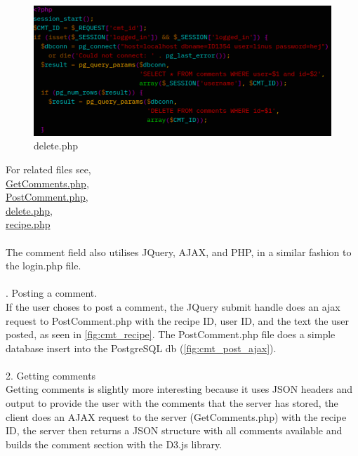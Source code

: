 \documentclass[a4paper]{scrartcl}
\begin{document}
\begin{figure}[H]
  \begin{center}
    \includegraphics[scale=0.9]{images/cmt_delete.png}
    \caption{delete.php}
    \label{fig:cmt_delete}
  \end{center}
\end{figure}
\noindent
For related files see,\\
\href{https://github.com/linus-dev/KTH-Projects/blob/master/ID1354/2/GetComments.php}{GetComments.php},\\
\href{https://github.com/linus-dev/KTH-Projects/blob/master/ID1354/2/PostComment.php}{PostComment.php},\\
\href{https://github.com/linus-dev/KTH-Projects/blob/master/ID1354/2/delete.php}{delete.php},\\
\href{https://github.com/linus-dev/KTH-Projects/blob/master/ID1354/2/recipe.php}{recipe.php}
\\\\
\noindent
The comment field also utilises JQuery, AJAX, and PHP, in a similar fashion to the login.php file.
\\\\
. Posting a comment.\\
  If the user choses to post a comment, the JQuery submit handle does an ajax request to
  PostComment.php with the recipe ID, user ID, and the text the user posted, as seen in \ref{fig:cmt_recipe}.
  The PostComment.php file does a simple database insert into the PostgreSQL db (\ref{fig:cmt_post_ajax}).
\\\\
2. Getting comments\\
  Getting comments is slightly more interesting because it uses JSON headers and output to
  provide the user with the comments that the server has stored, the client does an AJAX
  request to the server (GetComments.php) with the recipe ID, the server then returns a JSON structure
  with all comments available and builds the comment section with the D3.js library.
\end{document}
